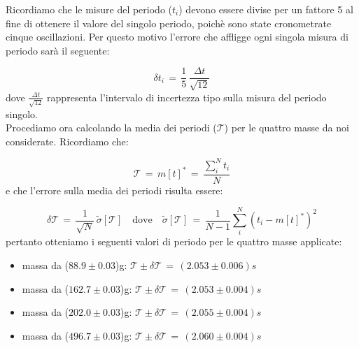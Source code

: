 Ricordiamo che le misure del periodo ($t_i$) devono essere divise per un fattore 5 al fine di ottenere il valore del singolo periodo, poichè sono state cronometrate cinque oscillazioni. Per questo motivo l'errore che affligge ogni singola misura di periodo sarà il seguente:

\begin{equation*}
	\delta t_i \,=\, \frac{1}{5} \, \frac{\Delta t}{\sqrt{12}}
\end{equation*}
%
dove $\frac{\Delta t}{\sqrt{12}}$ rappresenta l'intervalo di incertezza tipo sulla misura del periodo singolo.\\
Procediamo ora calcolando la media dei periodi ($\mathcal{T}$) per le quattro masse da noi considerate. Ricordiamo che:

\begin{equation*}
	\mathcal{T} \,=\, m[t]^* \,=\, \frac{\sum_{i}^{N} t_i}{N}
\end{equation*}
%
e che l'errore sulla media dei periodi risulta essere:

\begin{equation*}
	\delta \mathcal{T} \,=\, \frac{1}{\sqrt{N}} \, \tilde\sigma[\mathcal{T}] \quad \text{dove} \quad \tilde\sigma[\mathcal{T}] \,=\, \frac{1}{N-1} \sum_{i}^{N} (t_i - m[t]^*)^2
\end{equation*}
%
pertanto otteniamo i seguenti valori di periodo per le quattro masse applicate:
\begin{itemize}
	\item{ massa da ($88.9 \pm 0.03$)g: $\mathcal{T} \pm \delta\mathcal{T} \,=\, (2.053 \pm 0.006) s $}
	\item{ massa da ($162.7 \pm 0.03$)g: $\mathcal{T} \pm \delta\mathcal{T} \,=\, (2.053 \pm 0.004) s $}
	\item{ massa da ($202.0 \pm 0.03$)g: $\mathcal{T} \pm \delta\mathcal{T} \,=\, (2.055 \pm 0.004) s $}
	\item{ massa da ($496.7 \pm 0.03$)g: $\mathcal{T} \pm \delta\mathcal{T} \,=\, (2.060 \pm 0.004) s $}
\end{itemize}



